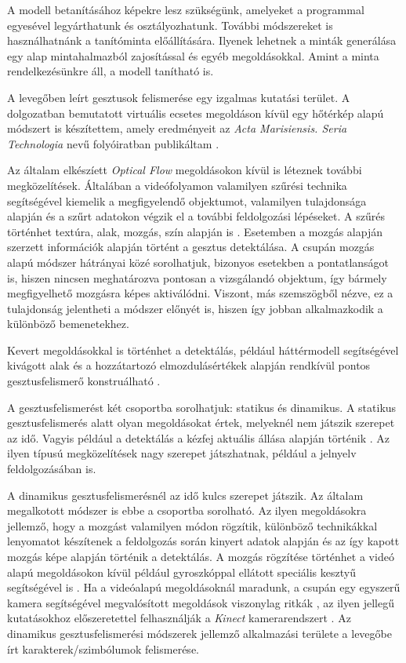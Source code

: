A modell betanításához képekre lesz szükségünk, amelyeket a programmal egyesével legyárthatunk és osztályozhatunk. További módszereket is használhatnánk a tanítóminta előállítására. Ilyenek lehetnek a minták generálása egy alap mintahalmazból zajosítással és egyéb megoldásokkal. Amint a minta rendelkezésünkre áll, a modell tanítható is.

A levegőben leírt gesztusok felismerése egy izgalmas kutatási terület. A dolgozatban bemutatott virtuális ecsetes megoldáson kívül egy hőtérkép alapú módszert is készítettem, amely eredményeit az \emph{Acta Marisiensis. Seria Technologia} nevű folyóiratban publikáltam \cite{nagy2020gesture}.

Az általam elkészíett \textit{Optical Flow} megoldásokon kívül is léteznek további megközelítések. Általában a videófolyamon valamilyen szűrési technika segítségével kiemelik a megfigyelendő objektumot, valamilyen tulajdonsága alapján és a szűrt adatokon végzik el a további feldolgozási lépéseket. A szűrés történhet textúra, alak, mozgás, szín alapján is \cite{fadhil2018trackingsurvey}. Esetemben a mozgás alapján szerzett információk alapján történt a gesztus detektálása. A csupán mozgás alapú módszer hátrányai közé sorolhatjuk, bizonyos esetekben a pontatlanságot is, hiszen nincsen meghatározva pontosan a vizsgálandó objektum, így bármely megfigyelhető mozgásra képes aktiválódni. Viszont, más szemszögből nézve, ez a tulajdonság jelentheti a módszer előnyét is, hiszen így jobban alkalmazkodik a különböző bemenetekhez.

Kevert megoldásokkal is történhet a detektálás, például háttérmodell segítségével kivágott alak és a hozzátartozó elmozdulásértékek alapján rendkívül pontos gesztusfelismerő konstruálható \cite{lin2009recognizing}.

A gesztusfelismerést két csoportba sorolhatjuk: statikus és dinamikus. A statikus gesztusfelismerés alatt olyan megoldásokat értek, melyeknél nem játszik szerepet az idő. Vagyis például a detektálás a kézfej aktuális állása alapján történik \cite{purohit2018precisehand,robust2017mouse,kumar2019calculator}. Az ilyen típusú megközelítések nagy szerepet játszhatnak, például a jelnyelv feldolgozásában is.

A dinamikus gesztusfelismerésnél az idő kulcs szerepet játszik. Az általam megalkotott módszer is ebbe a csoportba sorolható. Az ilyen megoldásokra jellemző, hogy a mozgást valamilyen módon rögzítik, különböző technikákkal lenyomatot készítenek a feldolgozás során kinyert adatok alapján és az így kapott mozgás képe alapján történik a detektálás. A mozgás rögzítése történhet a videó alapú megoldásokon kívül például gyroszkóppal ellátott speciális kesztyű segítségével is \cite{ponraj2012wireless}. Ha a videóalapú megoldásoknál maradunk, a csupán egy egyszerű kamera segítségével megvalósított megoldások viszonylag ritkák \cite{joseph2018visual}, az ilyen jellegű kutatásokhoz előszeretettel felhasználják a \textit{Kinect} kamerarendszert \cite{zhang2013new,tang2018structured}.
Az dinamikus gesztusfelismerési módszerek jellemző alkalmazási területe a levegőbe írt karakterek/szimbólumok felismerése.

